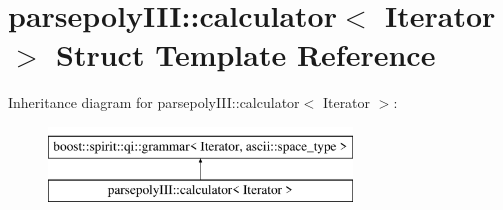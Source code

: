 \hypertarget{structparsepoly_i_i_i_1_1calculator}{}\section{parsepoly\+I\+II\+:\+:calculator$<$ Iterator $>$ Struct Template Reference}
\label{structparsepoly_i_i_i_1_1calculator}
Inheritance diagram for parsepoly\+I\+II\+:\+:calculator$<$ Iterator $>$\+:\begin{figure}[H]
\begin{center}
\leavevmode
\includegraphics[height=2.000000cm]{structparsepoly_i_i_i_1_1calculator}
\end{center}
\end{figure}
